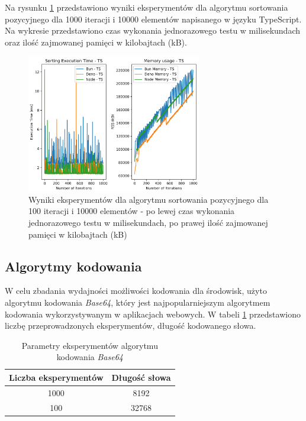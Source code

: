 Na rysunku \ref{fig:radix_sorting_e4_ts} przedstawiono wyniki eksperymentów dla algorytmu sortowania pozycyjnego dla 1000 iteracji i 10000 elementów napisanego w języku TypeScript. Na wykresie przedstawiono czas wykonania jednorazowego testu w milisekundach oraz ilość zajmowanej pamięci w kilobajtach (kB).

\begin{figure}[H]
  \centering
  \includegraphics[width=0.68\textwidth]{Figures/sorting/sorting_radix_1000_10000_ts.png}
  \caption{Wyniki eksperymentów dla algorytmu sortowania pozycyjnego dla 100 iteracji i 10000 elementów - po lewej czas wykonania jednorazowego testu w milisekundach, po prawej ilość zajmowanej pamięci w kilobajtach (kB)}
  \label{fig:radix_sorting_e4_ts}
\end{figure}

\subsection{Algorytmy kodowania}
W celu zbadania wydajności możliwości kodowania dla środowisk, użyto algorytmu kodowania \textit{Base64}, który jest najpopularniejszym algorytmem kodowania wykorzystywanym w aplikacjach webowych. W tabeli \ref{tab:encoding_experiments} przedstawiono liczbę przeprowadzonych eksperymentów, długość kodowanego słowa.

\begin{table}[H]
  \centering
  \caption{Parametry eksperymentów algorytmu kodowania \textit{Base64}}
  \begin{tabular}{|c|c|}
    \hline
    \textbf{Liczba eksperymentów} & \textbf{Długość słowa}\\ \hline
    1000 & 8192 \\ \hline
    100 & 32768 \\ \hline
  \end{tabular}
  \label{tab:encoding_experiments}
\end{table}

